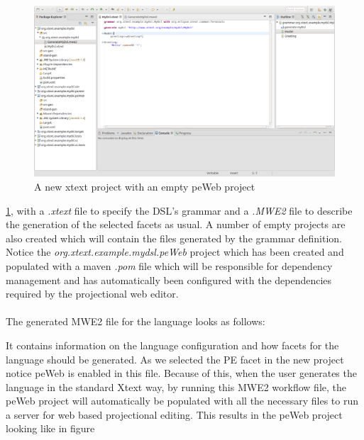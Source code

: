 \documentclass{article}
\begin{document}
\begin{figure}[h!]
  \includegraphics[width=\linewidth]{./Screenshots/newProjectScreen.png}
  \caption{A new xtext project with an empty peWeb project}
  \label{fig:newProjectScreen}
\end{figure} \ref{fig:newProjectScreen}, with a \emph{.xtext} file to specify the DSL's grammar and a \emph{.MWE2} file to describe the generation of the selected facets as usual. A number of empty projects are also created which will contain the files generated by the grammar definition. Notice the \emph{org.xtext.example.mydsl.peWeb} project which has been created and populated with a maven \emph{.pom} file which will be responsible for dependency management and has automatically been configured with the dependencies required by the projectional web editor. 
\\
\\
The generated MWE2 file for the language looks as follows:

It contains information on the language configuration and how facets for the language should be generated. As we selected the PE facet in the new project notice peWeb is enabled in this file. Because of this, when the user generates the language in the standard Xtext way, by running this MWE2 workflow file, the peWeb project will automatically be populated with all the necessary files to run a server for web based projectional editing. This results in the peWeb project looking like in figure 
\end{document}
